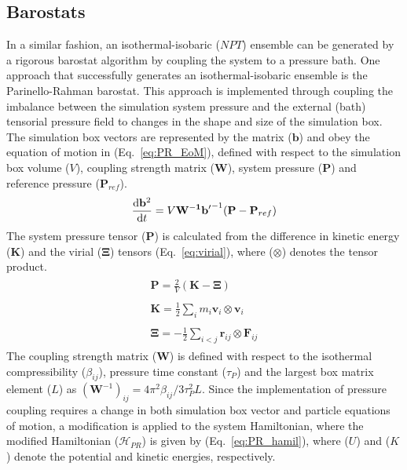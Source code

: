 \subsection{Barostats}
In a similar fashion, an isothermal-isobaric ($NPT$) ensemble can be generated by a rigorous barostat algorithm by coupling the system to a pressure bath. One approach that successfully generates an isothermal-isobaric ensemble is the Parinello-Rahman barostat.\cite{parrinello1981polymorphic} This approach is implemented through coupling the imbalance between the simulation system pressure and the external (bath) tensorial pressure field to changes in the shape and size of the simulation box. The simulation box vectors are represented by the matrix ($\mathbf{b}$) and obey the equation of motion in (Eq.~\ref{eq:PR_EoM}), defined with respect to the simulation box volume ($V$), coupling strength matrix ($\mathbf{W}$), system pressure ($\mathbf{P}$) and reference pressure ($\mathbf{P}_{ref}$).
%
\begin{equation} \label{eq:PR_EoM}
    \frac{\mathrm{d}\mathbf{b}^2}{\mathrm{d}t} = V \mathbf{W^{-1}}\mathbf{b'}^{-1} (\mathbf{P}-\mathbf{P}_{ref})
\end{equation}
%
The system pressure tensor ($\mathbf{P}$) is calculated from the difference in kinetic energy ($\mathbf{K}$) and the virial ($\bm{\Xi}$) tensors (Eq.~\ref{eq:virial}), where ($\otimes$) denotes the tensor product. 
%
\begin{subequations} \label{eq:virial}
\begin{align}
\begin{split}
    \mathbf{P} = \frac{2}{V}(\mathbf{K} - \bm{\Xi})
\end{split}\\
\begin{split}
    \mathbf{K} = \frac{1}{2}\sum_i m_i \mathbf{v}_i \otimes \mathbf{v}_i
\end{split}\\
\begin{split}
    \bm{\Xi} = -\frac{1}{2}\sum_{i<j} \mathbf{r}_{ij} \otimes \mathbf{F}_{ij} 
\end{split}
\end{align}
\end{subequations}
%
The coupling strength matrix ($\mathbf{W}$) is defined with respect to the isothermal compressibility ($\beta_{ij}$), pressure time constant ($\tau_P$) and the largest box matrix element ($L$) as $(\mathbf{W}^{-1})_{ij} = 4 \pi^2 \beta_{ij} / 3 \tau_P^2 L$. Since the implementation of pressure coupling requires a change in both simulation box vector and particle equations of motion, a modification is applied to the system Hamiltonian, where the modified Hamiltonian ($\mathcal{H}_{PR}$) is given by (Eq.~\ref{eq:PR_hamil}), where ($U$) and ($K$) denote the potential and kinetic energies, respectively. 

